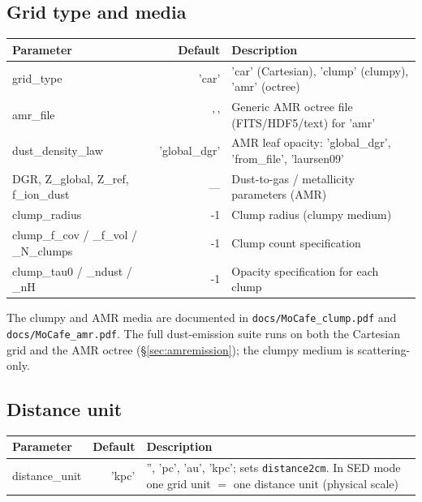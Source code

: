 \documentclass[english,a4paper]{kiseon_memo}
\newcommand{\code}[1]{\texttt{#1}}
\newcommand{\file}[1]{\texttt{#1}}
\begin{document}
\subsection{Grid type and media}
\begin{longtable}{P D X}
\toprule
\textrm{Parameter} & \textrm{Default} & \textrm{Description}\\
\midrule \endhead
grid\_type         & 'car'  & 'car' (Cartesian), 'clump' (clumpy), 'amr' (octree)\\
amr\_file          & '\,'   & Generic AMR octree file (FITS/HDF5/text) for 'amr'\\
dust\_density\_law        & 'global\_dgr' & AMR leaf opacity: 'global\_dgr', 'from\_file', 'laursen09'\\
DGR, Z\_global, Z\_ref, f\_ion\_dust & --- & Dust-to-gas / metallicity parameters (AMR)\\
clump\_radius      & -1     & Clump radius (clumpy medium)\\
clump\_f\_cov / \_f\_vol / \_N\_clumps & -1 & Clump count specification\\
clump\_tau0 / \_ndust / \_nH & -1 & Opacity specification for each clump\\
\bottomrule
\end{longtable}
The clumpy and AMR media are documented in \file{docs/MoCafe\_clump.pdf} and
\file{docs/MoCafe\_amr.pdf}.  The full dust-emission suite runs on both the
Cartesian grid and the AMR octree (\S\ref{sec:amremission}); the clumpy medium
is scattering-only.

\subsection{Distance unit}
\begin{longtable}{P D X}
\toprule
\textrm{Parameter} & \textrm{Default} & \textrm{Description}\\
\midrule \endhead
distance\_unit     & 'kpc'  & '', 'pc', 'au', 'kpc'; sets \code{distance2cm}. In SED mode one grid unit $=$ one distance unit (physical scale)\\
\bottomrule
\end{longtable}
\end{document}
